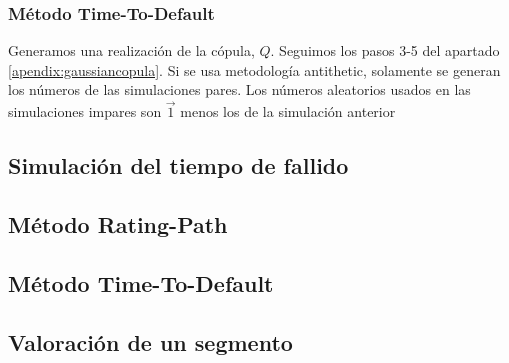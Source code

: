 \subsubsection{M\'etodo Time-To-Default}

Generamos una realizaci\'on de la c\'opula, $Q$.
Seguimos los pasos 3-5 del apartado \ref{apendix:gaussiancopula}.
\newline
\newline
Si se usa metodolog\'ia antithetic, solamente se generan los n\'umeros
de las simulaciones pares. Los n\'umeros aleatorios usados en las simulaciones
impares son $\vec{1}$ menos los de la simulaci\'on anterior 

\subsection{Simulaci\'on del tiempo de fallido}

\subsection{M\'etodo Rating-Path}

\subsection{M\'etodo Time-To-Default}

\subsection{Valoraci\'on de un segmento}



